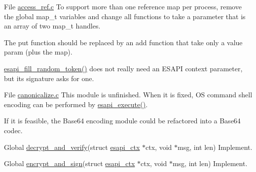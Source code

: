 \label{todo__todo000001}
\hypertarget{todo__todo000001}{}
 
\begin{DoxyDescription}
\item[File \hyperlink{access__ref_8c}{access\_\-ref.c} ]To support more than one reference map per process, remove the global map\_\-t variables and change all functions to take a parameter that is an array of two map\_\-t handles.

The put function should be replaced by an add function that take only a value param (plus the map).

\hyperlink{crypto_8c_ac5f468de6f8d67ebb7c6cb85f74f9654}{esapi\_\-fill\_\-random\_\-token()} does not really need an ESAPI context parameter, but its signature asks for one.
\end{DoxyDescription}

\label{todo__todo000004}
\hypertarget{todo__todo000004}{}
 
\begin{DoxyDescription}
\item[File \hyperlink{canonicalize_8c}{canonicalize.c} ]This module is unfinished. When it is fixed, OS command shell encoding can be performed by \hyperlink{executor_8c_a3f7b0fed7fd557786a1659acb618b62e}{esapi\_\-execute()}.

If it is feasible, the Base64 encoding module could be refactored into a Base64 codec.
\end{DoxyDescription}

\label{todo__todo000008}
\hypertarget{todo__todo000008}{}
 
\begin{DoxyDescription}
\item[Global \hyperlink{crypto_8c_a53d8171b09003a778a85ab3b80af27c1}{decrypt\_\-and\_\-verify}(struct \hyperlink{structesapi__ctx}{esapi\_\-ctx} $\ast$ctx, void $\ast$msg, int len) ]Implement. 
\end{DoxyDescription}

\label{todo__todo000007}
\hypertarget{todo__todo000007}{}
 
\begin{DoxyDescription}
\item[Global \hyperlink{crypto_8c_ad06f6e3f52cf7134df20ea3eabb8dc6d}{encrypt\_\-and\_\-sign}(struct \hyperlink{structesapi__ctx}{esapi\_\-ctx} $\ast$ctx, void $\ast$msg, int len) ]Implement. 
\end{DoxyDescription}

\label{todo__todo000006}
\hypertarget{todo__todo000006}{}
 
